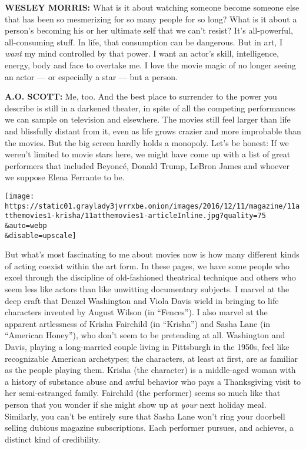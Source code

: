 \textbf{WESLEY MORRIS:} What is it about watching someone become someone
else that has been so mesmerizing for so many people for so long? What
is it about a person's becoming his or her ultimate self that we can't
resist? It's all-powerful, all-consuming stuff. In life, that
consumption can be dangerous. But in art, I \emph{want} my mind
controlled by that power. I want an actor's skill, intelligence, energy,
body and face to overtake me. I love the movie magic of no longer seeing
an actor --- or especially a star --- but a person.

\textbf{A.O. SCOTT:} Me, too. And the best place to surrender to the
power you describe is still in a darkened theater, in spite of all the
competing performances we can sample on television and elsewhere. The
movies still feel larger than life and blissfully distant from it, even
as life grows crazier and more improbable than the movies. But the big
screen hardly holds a monopoly. Let's be honest: If we weren't limited
to movie stars here, we might have come up with a list of great
performers that included Beyoncé, Donald Trump, LeBron James and whoever
we suppose Elena Ferrante to be.

\texttt{[image: https://static01.graylady3jvrrxbe.onion/images/2016/12/11/magazine/11atthemovies1-krisha/11atthemovies1-articleInline.jpg?quality=75\\\&auto=webp\\\&disable=upscale]}

But what's most fascinating to me about movies now is how many different
kinds of acting coexist within the art form. In these pages, we have
some people who excel through the discipline of old-fashioned theatrical
technique and others who seem less like actors than like unwitting
documentary subjects. I marvel at the deep craft that Denzel Washington
and Viola Davis wield in bringing to life characters invented by August
Wilson (in ``Fences''). I also marvel at the apparent artlessness of
Krisha Fairchild (in ``Krisha'') and Sasha Lane (in ``American Honey''),
who don't seem to be pretending at all. Washington and Davis, playing a
long-married couple living in Pittsburgh in the 1950s, feel like
recognizable American archetypes; the characters, at least at first, are
as familiar as the people playing them. Krisha (the character) is a
middle-aged woman with a history of substance abuse and awful behavior
who pays a Thanksgiving visit to her semi-estranged family. Fairchild
(the performer) seems so much like that person that you wonder if she
might show up at \emph{your} next holiday meal. Similarly, you can't be
entirely sure that Sasha Lane won't ring your doorbell selling dubious
magazine subscriptions. Each performer pursues, and achieves, a distinct
kind of credibility.

